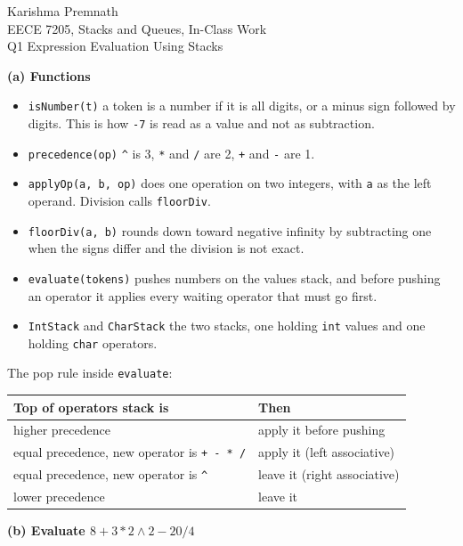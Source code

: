 \documentclass[11pt]{article}
\begin{document}
Karishma Premnath \\
EECE 7205, Stacks and Queues, In-Class Work \\
Q1 Expression Evaluation Using Stacks

\hrulefill

\textbf{(a) Functions}

\begin{itemize}[leftmargin=*, itemsep=2pt, topsep=2pt]
\item \texttt{isNumber(t)} \quad a token is a number if it is all digits, or a minus sign
      followed by digits. This is how \texttt{-7} is read as a value and not as subtraction.
\item \texttt{precedence(op)} \quad \texttt{\^{}} is 3, \texttt{*} and \texttt{/} are 2,
      \texttt{+} and \texttt{-} are 1.
\item \texttt{applyOp(a, b, op)} \quad does one operation on two integers,
      with \texttt{a} as the left operand. Division calls \texttt{floorDiv}.
\item \texttt{floorDiv(a, b)} \quad rounds down toward negative infinity by subtracting one
      when the signs differ and the division is not exact.
\item \texttt{evaluate(tokens)} \quad pushes numbers on the values stack, and before pushing
      an operator it applies every waiting operator that must go first.
\item \texttt{IntStack} and \texttt{CharStack} \quad the two stacks, one holding
      \texttt{int} values and one holding \texttt{char} operators.
\end{itemize}

The pop rule inside \texttt{evaluate}:

\begin{tabular}{ll}
Top of operators stack is & Then \\[2pt]
\hline
higher precedence & apply it before pushing \\
equal precedence, new operator is \texttt{+ - * /} & apply it (left associative) \\
equal precedence, new operator is \texttt{\^{}} & leave it (right associative) \\
lower precedence & leave it \\
\end{tabular}

\textbf{(b) Evaluate $8 + 3 * 2 \wedge 2 - 20 / 4$}
\end{document}
